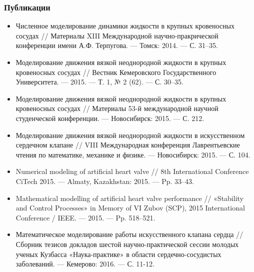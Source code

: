 \documentclass[14pt]{beamer}
\begin{document}
\begin{frame}
\frametitle{Публикации}
    {\tiny
        \begin{itemize}
            \item[\MVRightarrow] Численное моделирование динамики жидкости в крупных кровеносных сосудах // Материалы XIII Международной научно-пракрической конференции имени А.Ф. Терпугова. — Томск: 2014. — С. 31–35.  
            \item[\MVRightarrow] Моделирование движения вязкой неоднородной жидкости в крупных кровеносных сосудах // Вестник Кемеровского Государственного Университета. — 2015. — Т. 1, № 2 (62). — С. 30–35.
            \item[\MVRightarrow] Моделирование движения вязкой неоднородной жидкости в крупных кровеносных сосудах // Материалы 53-й международной научной студенческой конференции. — Новосибирск: 2015. — С. 212.
            \item[\MVRightarrow] Моделирование движения вязкой неоднородной жидкости в искусственном сердечном клапане // VIII Международная конференция Лаврентьевские чтения по математике, механике и физике. — Новосибирск: 2015. — С. 104.
            \item[\MVRightarrow] Numerical modeling of artificial heart valve // 8th International Conference CiTech 2015. — Almaty, Kazakhstan: 2015. — Pp. 33–43.
            \item[\MVRightarrow] Mathematical modelling of artificial heart valve performance // «Stability and Control Processes» in Memory of VI Zubov (SCP), 2015 International Conference / IEEE. — 2015. — Pp. 518–521.
            \item[\MVRightarrow] Математическое моделирование работы искусственного клапана сердца // Сборник тезисов докладов шестой научно-практической сессии молодых ученых Кузбасса «Наука-практике» в области сердечно-сосудистых заболеваний. — Кемерово: 2016. — С. 11-12.
        \end{itemize}
    }
\end{frame}
\end{document}
